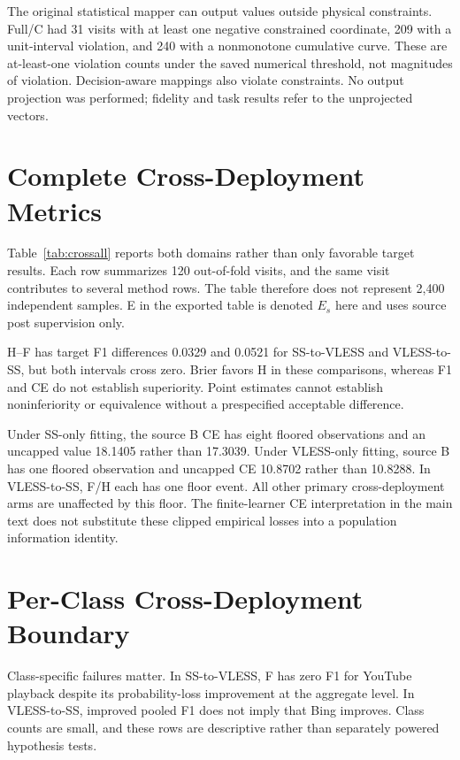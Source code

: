 \documentclass[journal]{IEEEtran}
\begin{document}
The original statistical mapper can output values outside physical constraints. Full/C had 31 visits with at least one negative constrained coordinate, 209 with a unit-interval violation, and 240 with a nonmonotone cumulative curve. These are at-least-one violation counts under the saved numerical threshold, not magnitudes of violation. Decision-aware mappings also violate constraints. No output projection was performed; fidelity and task results refer to the unprojected vectors.

\section{Complete Cross-Deployment Metrics}
Table~\ref{tab:crossall} reports both domains rather than only favorable target results. Each row summarizes 120 out-of-fold visits, and the same visit contributes to several method rows. The table therefore does not represent 2,400 independent samples. E in the exported table is denoted $E_s$ here and uses source post supervision only.
\begin{table}[t]\centering\caption{All source-only fitting results. CE is in bits.}\label{tab:crossall}\scriptsize\end{table}
\begin{table}[t]\centering\caption{Target-side paired contrasts. Positive CE gain denotes a reduction. Intervals are conditional, unadjusted content-bootstrap intervals.}\label{tab:crossci}\small\end{table}

H--F has target F1 differences 0.0329 and 0.0521 for SS-to-VLESS and VLESS-to-SS, but both intervals cross zero. Brier favors H in these comparisons, whereas F1 and CE do not establish superiority. Point estimates cannot establish noninferiority or equivalence without a prespecified acceptable difference.

Under SS-only fitting, the source B CE has eight floored observations and an uncapped value 18.1405 rather than 17.3039. Under VLESS-only fitting, source B has one floored observation and uncapped CE 10.8702 rather than 10.8288. In VLESS-to-SS, F/H each has one floor event. All other primary cross-deployment arms are unaffected by this floor. The finite-learner CE interpretation in the main text does not substitute these clipped empirical losses into a population information identity.

\section{Per-Class Cross-Deployment Boundary}
\begin{table}[t]\centering\caption{Target macro-class components: per-class F1, 20 visits per class and direction.}\label{tab:classes}\small\end{table}
Class-specific failures matter. In SS-to-VLESS, F has zero F1 for YouTube playback despite its probability-loss improvement at the aggregate level. In VLESS-to-SS, improved pooled F1 does not imply that Bing improves. Class counts are small, and these rows are descriptive rather than separately powered hypothesis tests.
\end{document}
